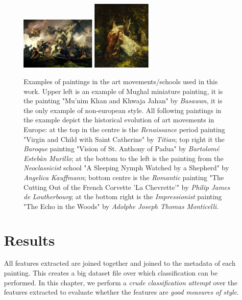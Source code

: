 \documentclass[11pt,a4paper,twoside,openright]{report}
\begin{document}
\begin{figure}[tbp]
\includegraphics[width=0.33\textwidth]{loutherbourg_k264}
\includegraphics[width=0.26\textwidth]{monticelli_300}
\caption[Examples of paintings in art movements/schools]{Examples of paintings
in the art movements/schools used in this work.  Upper left is an example of
Mughal miniature painting, it is the painting "Mu'nim Khan and Khwaja Jahan" by
\emph{Basawan}, it is the only example of non-european style.  All following
paintings in the example depict the historical evolution of art movements in
Europe: at the top in the centre is the \emph{Renaissance} period painting
"Virgin and Child with Saint Catherine" by \emph{Titian};  top right it the
\emph{Baroque} painting "Vision of St. Anthony of Padua" by \emph{Bartolom\'e
Esteb\`an Murillo}; at the bottom to the left is the painting from the
\emph{Neoclassicist} school "A Sleeping Nymph Watched by a Shepherd" by
\emph{Angelica Kauffmann}; bottom centre is the \emph{Romantic} painting "The
Cutting Out of the French Corvette 'La Chevrette'" by \emph{Philip James de
Loutherbourg}; at the bottom right is the \emph{Impressionist} painting "The
Echo in the Woods" by \emph{Adolphe Joseph Thomas Monticelli}.}
\label{fig:styles}
\end{figure}


\clearpage{\pagestyle{empty}\cleardoublepage}
\chapter{Results}
\label{chap:results}

All features extracted are joined together and joined to the metadata of each
painting.  This creates a big dataset file over which classification can be
performed.  In this chapter, we perform a \emph{crude classification attempt}
over the features extracted to evaluate whether the features are \emph{good
measures of style}.
\end{document}
